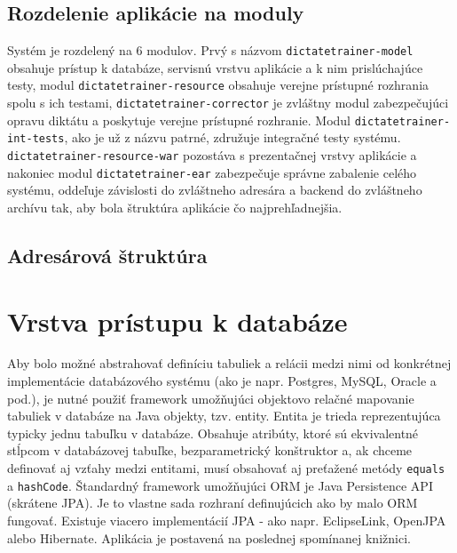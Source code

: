 \documentclass[12pt,oneside]{fithesis2}
\begin{document}
      	\subsection{Rozdelenie aplikácie na moduly}
      	\par Systém je rozdelený na 6 modulov. Prvý s názvom \texttt{dictatetrainer-model} obsahuje prístup k databáze, servisnú vrstvu aplikácie a k nim prislúchajúce testy, modul \texttt{dictatetrainer-resource} obsahuje verejne prístupné rozhrania spolu s ich testami, \texttt{dictatetrainer-corrector} je zvláštny modul zabezpečujúci opravu diktátu a poskytuje verejne prístupné rozhranie. Modul \texttt{dictatetrainer-int-tests}, ako je už z názvu patrné, združuje integračné testy systému. \texttt{dictatetrainer-resource-war} pozostáva s prezentačnej vrstvy aplikácie a nakoniec modul \texttt{dictatetrainer-ear} zabezpečuje správne zabalenie celého systému, oddeľuje závislosti do zvláštneho adresára a backend do zvláštneho archívu tak, aby bola štruktúra aplikácie čo najprehľadnejšia.
      	
      	\subsection{Adresárová štruktúra}
      	
      \section{Vrstva prístupu k databáze}
      
      \par Aby bolo možné abstrahovať definíciu tabuliek a relácii medzi nimi od konkrétnej implementácie databázového systému (ako je napr. Postgres, MySQL, Oracle a pod.), je nutné použiť framework umožňujúci objektovo relačné mapovanie tabuliek v databáze na Java objekty, tzv. entity. Entita je trieda reprezentujúca typicky jednu tabuľku v databáze. Obsahuje atribúty, ktoré sú ekvivalentné stĺpcom v databázovej tabuľke, bezparametrický konštruktor a, ak chceme definovať aj vzťahy medzi entitami, musí obsahovať aj preťažené metódy \texttt{equals} a \texttt{hashCode}. Štandardný framework umožňujúci ORM je Java Persistence API (skrátene JPA). Je to vlastne sada rozhraní definujúcich ako by malo ORM fungovať. Existuje viacero implementácií JPA - ako napr. EclipseLink, OpenJPA alebo Hibernate. Aplikácia je postavená na poslednej spomínanej knižnici.
      
      \pagebreak
\end{document}
